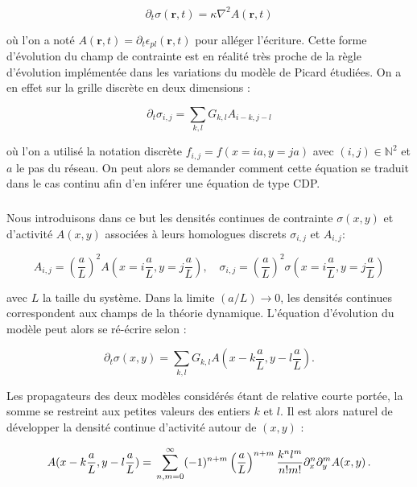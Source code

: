 \begin{equation}
	\partial_t \sigma(\mathbf{r},t) = \kappa\nabla^2 A(\mathbf{r},t)
\end{equation}

\noindent où l'on a noté $A(\mathbf{r},t) = \partial_t \epsilon_{pl}(\mathbf{r},t)$ pour alléger l'écriture. Cette forme d'évolution du champ de contrainte est en réalité très proche de la règle d'évolution implémentée dans les variations du modèle de Picard étudiées. On a en effet sur la grille discrète en deux dimensions :


\begin{equation}
    \partial_t\sigma_{i,j} = \sum_{k,l}G_{k,l}A_{i-k, j-l}
    \label{eq:1}
\end{equation}

\noindent où l'on a utilisé la notation discrète $f_ {i,j}=f(x=ia, y=ja)$ avec $(i,j) \in \mathbb{N}^2$ et $a$ le pas du réseau. On peut alors se demander comment cette équation se traduit dans le cas continu afin d'en inférer une équation de type CDP.

\subparagraph{}Nous introduisons dans ce but les densités continues de contrainte $\sigma (x,y)$ et d'activité $A (x,y)$ associées à leurs homologues discrets  $\sigma_{i, j}$ et $A_{i, j}$:

\begin{equation}
    A_{i, j} = \left( \frac{a}{L} \right)^2A(x=i\frac{a}{L},y=j\frac{a}{L}),\quad
    \sigma_{i, j} = \left( \frac{a}{L} \right)^2\sigma(x=i\frac{a}{L},y=j\frac{a}{L})
\end{equation}

\noindent avec $L$ la taille du système. Dans la limite $(a/L) \rightarrow 0$, les densités continues correspondent aux champs de la théorie dynamique. L'équation d'évolution du modèle peut alors se ré-écrire selon :

\begin{equation}
    \partial_t\sigma (x,y) = \sum_{k,l}G_{k,l}A(x-k\frac{a}{L}, y-l\frac{a}{L}).
    \label{eq:2}
\end{equation}

\noindent Les propagateurs des deux modèles considérés étant de relative courte portée, la somme se restreint aux petites valeurs des entiers $k$ et $l$. Il est alors naturel de développer la densité continue d'activité autour de $(x,y)$ :

\begin{equation}
    A(x-k\frac{a}{L}, y-l\frac{a}{L}) = \\ \sum_{n,m=0}^{\infty}(-1)^{n+m}\left( \frac{a}{L} \right)^{n+m}\frac{k^nl^m}{n!m!}\partial_x^n\partial_y^mA(x, y)\, .
\end{equation}

